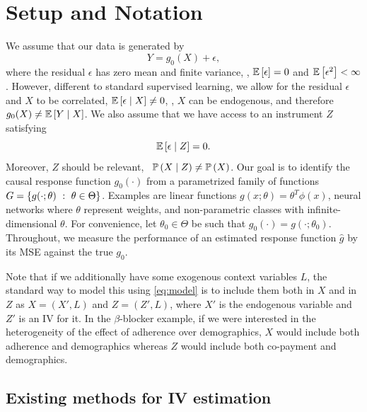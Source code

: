\documentclass{article}
\theoremstyle{plain}
\theoremstyle{definition}
\begin{document}
%
%

\section{Setup and Notation}
We assume that our data is generated by 
\begin{equation}\label{eq:model}
Y=g_0(X)+\epsilon,
\end{equation}
where the residual $\epsilon$ has zero mean and finite variance, \ie, $\mathbb{E}\left[{\epsilon}\right] = 0$ and  $\mathbb{E}\left[{\epsilon^2}\right]<\infty$. 
However, different to standard supervised learning, we allow for the residual $\epsilon$ and $X$ to be correlated, $\mathbb{E}\left[{\epsilon\mid X}\right]\neq0$, \ie, $X$ can be endogenous, and therefore $g_0(X)\neq\mathbb{E}\left[{Y\mid X}\right]$. We also assume that we have access to an instrument $Z$ satisfying 
\begin{equation}\label{eq:epsz}\mathbb{E}\left[{\epsilon\mid Z}\right]=0.\end{equation}
Moreover, $Z$ should be relevant, \ie~$\mathbb{P}\left(X\mid Z\right) \neq \mathbb{P}\left(X\right)$. Our goal is to identify the causal response function $g_0(\cdot)$ from a parametrized family of functions $G=\braces{g(\cdot;\theta)\ :\ \theta\in\Theta}$. Examples are linear functions $g(x;\theta)=\theta^T\phi(x)$, neural networks where $\theta$ represent weights, and non-parametric classes with infinite-dimensional $\theta$.
For convenience, let $\theta_0\in\Theta$ be such that $g_0(\cdot)=g(\cdot;\theta_0)$. Throughout, we measure the performance of an estimated response function $\hat{g}$ by its MSE against the true $g_0$.
%
%
%

Note that if we additionally have some exogenous context variables $L$, the standard way to model this using \cref{eq:model} is to include them both in $X$ and in $Z$ as $X = (X',L)$ and $Z = (Z',L)$, where $X'$ is the endogenous variable and $Z'$ is an IV for it.
In the $\beta$-blocker example, if we were interested in the heterogeneity of the effect of adherence over demographics, 
$X$ would include both adherence and demographics whereas $Z$ would include both co-payment and demographics.
%
%
%
%

\subsection{Existing methods for IV estimation}\label{sec:existing}
\end{document}
